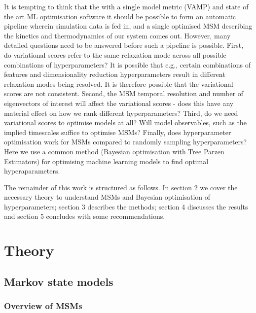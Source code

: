 \documentclass[journal=jacsat,manuscript=article]{achemso}
\begin{document}
It is tempting to think that the with a single model metric (VAMP) and state of the art ML optimisation  software it should be possible to form an automatic pipeline wherein simulation data is fed in, and a single optimised MSM describing the kinetics and thermodynamics of our system comes out. However, many detailed questions need to be answered before such a pipeline is possible. First, do variational scores refer to the same relaxation mode across all possible combinations of hyperparameters?  It is possible that e.g., certain combinations of features and dimensionality reduction hyperparameters result in different relaxation modes being resolved.  It is therefore possible that the variational scores are not consistent.  Second, the MSM temporal resolution and number of eigenvectors of interest will affect the variational scores - does this have any material effect on how we rank different hyperparameters? Third, do we need variational scores to optimise models at all?  Will model observables, such as the implied timescales suffice to optimise MSMs?  Finally, does hyperparameter optimisation work for MSMs compared to randomly sampling hyperparameters?  Here we use a common method (Bayesian optimisation with Tree Parzen Estimators) for optimising machine learning models to find optimal hyperaparameters. 


The remainder of this work is structured as follows.  In section 2 we cover the necessary theory to understand MSMs and Bayesian optimisation of hyperparameters; section 3 describes the methods; section 4 discusses the results and section 5 concludes with some recommendations. 

\section{Theory}\label{theory}
\subsection{Markov state models}
\subsubsection{Overview of MSMs}
\end{document}

